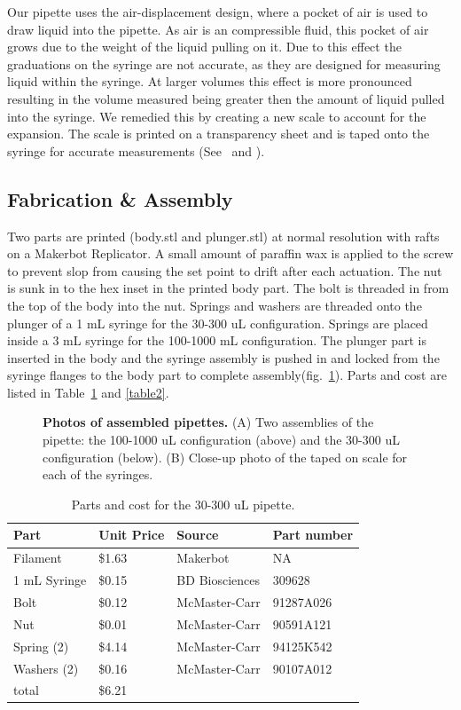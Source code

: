 \documentclass[10pt,letterpaper]{article}
\begin{document}
Our pipette uses the air-displacement design, where a pocket of air is used to draw liquid into the pipette.
As air is an compressible fluid, this pocket of air grows due to the weight of the liquid pulling on it.
Due to this effect the graduations on the syringe are not accurate, as they are designed for measuring liquid within the syringe.
At larger volumes this effect is more pronounced resulting in the volume measured being greater then the amount of liquid pulled into the syringe.
We remedied this by creating a new scale to account for the expansion.
The scale is printed on a transparency sheet and is taped onto the syringe for accurate measurements (See~ and ).

\subsection*{Fabrication \& Assembly}
Two parts are printed (body.stl and plunger.stl) at normal resolution with rafts on a Makerbot Replicator.
A small amount of paraffin wax is applied to the screw to prevent slop from causing the set point to drift after each actuation.
The nut is sunk in to the hex inset in the printed body part.
The bolt is threaded in from the top of the body into the nut.
Springs and washers are threaded onto the plunger of a 1 mL syringe for the 30-300 uL configuration.
Springs are placed inside a 3 mL syringe for the 100-1000 mL configuration.
The plunger part is inserted in the body and the syringe assembly is pushed in and locked from the syringe flanges to the body part to complete assembly(fig.~\ref{fig3}).
Parts and cost are listed in Table~\ref{table1} and \ref{table2}.

\begin{figure}
	\caption{
		{\bf Photos of assembled pipettes.}  (A) Two assemblies of the pipette: the 100-1000 uL configuration (above) and the 30-300 uL configuration (below). (B) Close-up photo of the taped on scale for each of the syringes. 
	}
	\label{fig3}
\end{figure}

\begin{table}[!ht]
\centering
\caption{Parts and cost for the 30-300 uL pipette.}
\label{table1}
\begin{tabular}{|l|l|l|l|}
	\hline
	Part         & Unit Price & Source         & Part number \\ \hline
	Filament     & \$1.63     & Makerbot       & NA          \\ \hline
	1 mL Syringe & \$0.15     & BD Biosciences & 309628      \\ \hline
	Bolt         & \$0.12     & McMaster-Carr  & 91287A026   \\ \hline
	Nut          & \$0.01     & McMaster-Carr  & 90591A121   \\ \hline
	Spring (2)   & \$4.14     & McMaster-Carr  & 94125K542   \\ \hline
	Washers (2)  & \$0.16     & McMaster-Carr  & 90107A012   \\ \hline
	total        & \$6.21     &                &             \\ \hline
\end{tabular}
\end{table}
\end{document}
